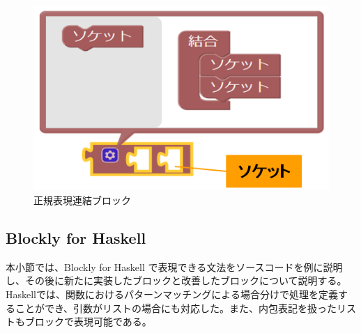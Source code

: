 \documentclass{risepaper}
\begin{document}
\begin{itemize}
\begin{figure}[h]
\begin{center}
\includegraphics[scale=0.8]{img/connection_block.png}
\caption{正規表現連結ブロック}%
\label{fig:connection_block}
\end{center}%
\end{figure}%

\end{itemize} 

   \subsection{Blockly for Haskell}

本小節では、Blockly for Haskell で表現できる文法をソースコードを例に説明し、その後に新たに実装したブロックと改善したブロックについて説明する。Haskellでは、関数におけるパターンマッチングによる場合分けで処理を定義することができ、引数がリストの場合にも対応した。また、内包表記を扱ったリストもブロックで表現可能である。
\end{document}
